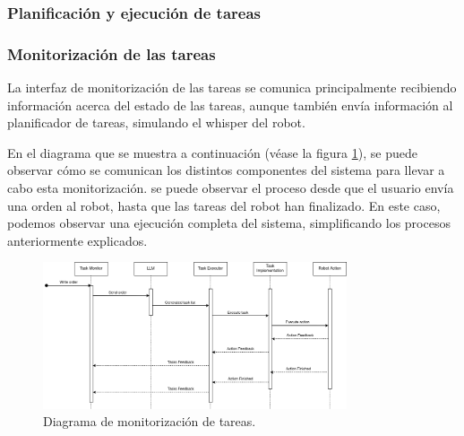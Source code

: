 \documentclass[../main.tex]{subfiles}
\begin{document}
\subsubsection{Planificación y ejecución de tareas}

\subsubsection{Monitorización de las tareas}
La interfaz de monitorización de las tareas se comunica principalmente recibiendo información acerca del estado de las tareas, aunque también envía información al planificador de tareas, simulando el whisper del robot. 

En el diagrama que se muestra a continuación (véase la figura \ref{fig:diseno_monitoring}), se puede observar cómo se comunican los distintos componentes del sistema para llevar a cabo esta monitorización.
se puede observar el proceso desde que el usuario envía una orden al robot, hasta que las tareas del robot han finalizado. En este caso, podemos observar una ejecución completa del sistema, simplificando los procesos anteriormente explicados.

\begin{figure}[H]
    \centering
    \includegraphics[width=0.8\textwidth]{images/diseno_seq_monitor.png}
    \caption{Diagrama de monitorización de tareas.}\label{fig:diseno_monitoring}
\end{figure}
\end{document}

